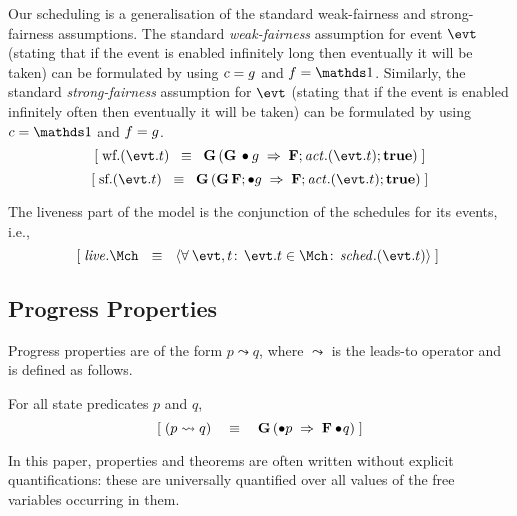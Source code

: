 Our scheduling is a generalisation of the standard weak-fairness and
strong-fairness assumptions. The standard \emph{weak-fairness}
assumption for event $\evt$ (stating that if the event is enabled
infinitely long then eventually it will be taken) can be formulated
by using $c = g$ and $\fsched = \one$.
Similarly, the standard \emph{strong-fairness} assumption for $\evt$
(stating that if the event is enabled infinitely often then eventually
it will be taken) can be formulated by using $\csched = \one$ and
$f = g$.
\begin{equation}
  \ew{ \wf.(\evt.t)  \2\equiv  \G (\G \bullet \guard \1\implies \F;\action.(\evt.t);\ctrue) }
\end{equation}
\begin{equation}
  \ew{ \strf.(\evt.t)  \2\equiv  \G (\G \F;\bullet \guard \1\implies \F;\action.(\evt.t);\ctrue) }
\end{equation}



The liveness part of the model is the conjunction of the schedules for its
events, i.e.,
\begin{equation}
  \label{eq:liveness}
  \ew{\liveness.\Mch \Wide{\eqv} \qforall{\evt, t}{\evt.t \in \Mch}{\schedule.(\evt.t)}}~
\end{equation}


\subsection{Progress Properties}
\label{sec:progress-properties}
Progress properties are of the form $p \leadsto q$, where
$\leadsto$ is the leads-to operator and is defined as follows.
\begin{Definition} For all state predicates $p$
  and $q$,
  \begin{equation}
    \label{eq:leadsto}
    [\; (p \leadsto q) ~~~\equiv~~~ \mathbf{G}\, (\bullet p ~\mathbin\Rightarrow~ \mathbf{F} \bullet \! q)  \;]
  \end{equation}
\end{Definition}
In this paper, properties and theorems are often written without
explicit quantifications: these are universally quantified over all
values of the free variables occurring in them.

